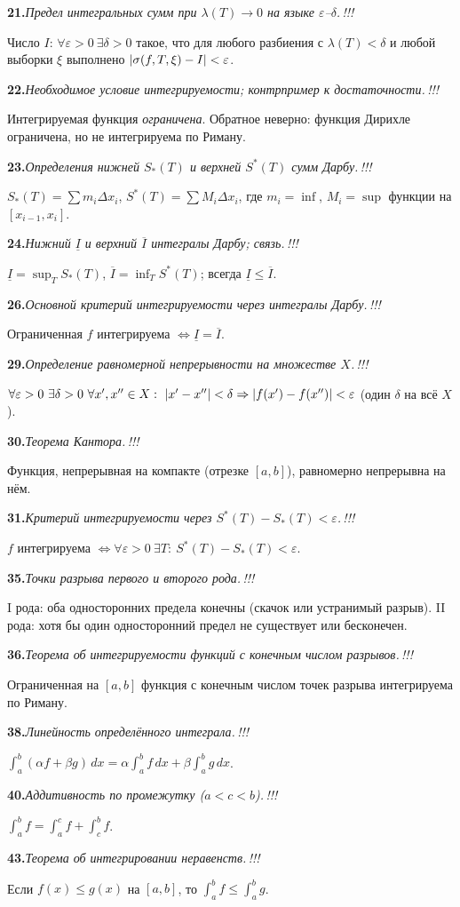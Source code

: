 \documentclass[10pt,a4paper]{article}
\newcommand{\dx}{\,dx}
\newcommand{\eps}{\varepsilon}
\renewcommand{\le}{\leqslant}
\DeclarePairedDelimiter{\abs}{\lvert}{\rvert}
\theoremstyle{definition}
\theoremstyle{plain}
\newcommand{\writespace}{\vspace{7.5mm}}
\newcommand{\tm}{\textcolor{teormin}{\,!!!}}
\newcommand{\faq}[3]{%
  \par\smallskip\noindent
  \textbf{#1.}\enspace\textit{#2}\par
  \nobreak\vspace{0.3ex}\noindent #3\par
  \writespace}
\begin{document}
\faq{21}{Предел интегральных сумм при $\lambda(T)\to0$ на языке $\eps$–$\delta$.\tm}{%
Число $I$: $\forall\eps>0\ \exists\delta>0$ такое, что для любого разбиения с $\lambda(T)<\delta$ и
любой выборки $\xi$ выполнено $\abs{\sigma(f,T,\xi)-I}<\eps$.}

\faq{22}{Необходимое условие интегрируемости; контрпример к достаточности.\tm}{%
Интегрируемая функция \emph{ограничена}. Обратное неверно: функция Дирихле ограничена, но не
интегрируема по Риману.}

\faq{23}{Определения нижней $S_*(T)$ и верхней $S^*(T)$ сумм Дарбу.\tm}{%
$S_*(T)=\sum m_i\Delta x_i$, $S^*(T)=\sum M_i\Delta x_i$, где $m_i=\inf$, $M_i=\sup$ функции на
$[x_{i-1},x_i]$.}

\faq{24}{Нижний $\underline I$ и верхний $\overline I$ интегралы Дарбу; связь.\tm}{%
$\underline I=\sup_T S_*(T)$, $\overline I=\inf_T S^*(T)$; всегда $\underline I\le\overline I$.}

\faq{26}{Основной критерий интегрируемости через интегралы Дарбу.\tm}{%
Ограниченная $f$ интегрируема $\iff\underline I=\overline I$.}

\faq{29}{Определение равномерной непрерывности на множестве $X$.\tm}{%
$\forall\eps>0\ \exists\delta>0\ \forall x',x''\in X:\ \abs{x'-x''}<\delta\Rightarrow
\abs{f(x')-f(x'')}<\eps$ (один $\delta$ на всё $X$).}

\faq{30}{Теорема Кантора.\tm}{%
Функция, непрерывная на компакте (отрезке $[a,b]$), равномерно непрерывна на нём.}

\faq{31}{Критерий интегрируемости через $S^*(T)-S_*(T)<\eps$.\tm}{%
$f$ интегрируема $\iff\forall\eps>0\ \exists T:\ S^*(T)-S_*(T)<\eps$.}

\faq{35}{Точки разрыва первого и второго рода.\tm}{%
I рода: оба односторонних предела конечны (скачок или устранимый разрыв). II рода: хотя бы один
односторонний предел не существует или бесконечен.}

\faq{36}{Теорема об интегрируемости функций с конечным числом разрывов.\tm}{%
Ограниченная на $[a,b]$ функция с конечным числом точек разрыва интегрируема по Риману.}

\faq{38}{Линейность определённого интеграла.\tm}{%
$\int_a^b(\alpha f+\beta g)\dx=\alpha\int_a^b f\dx+\beta\int_a^b g\dx$.}

\faq{40}{Аддитивность по промежутку ($a<c<b$).\tm}{%
$\int_a^b f=\int_a^c f+\int_c^b f$.}

\faq{43}{Теорема об интегрировании неравенств.\tm}{%
Если $f(x)\le g(x)$ на $[a,b]$, то $\int_a^b f\le\int_a^b g$.}
\end{document}
